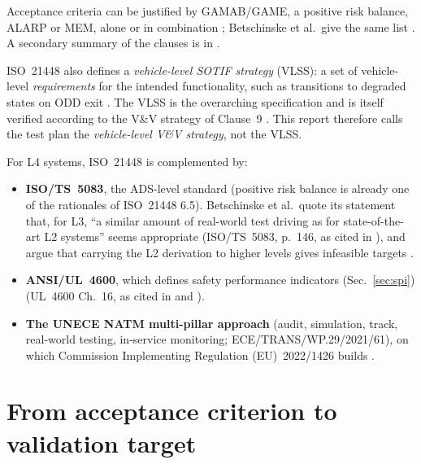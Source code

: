 \documentclass[11pt,a4paper]{article}
\begin{document}
Acceptance criteria can be justified by GAMAB/GAME, a positive risk balance, ALARP or MEM, alone or in combination \cite[6.5, pp.~30--31]{iso21448}; Betschinske et al.\ give the same list \cite[Sec.~III-B, item~2]{betschinske2025}. A secondary summary of the clauses is in \cite[Sec.~2.1, pp.~6--10]{schaller2026}.

ISO~21448 also defines a \emph{vehicle-level SOTIF strategy} (VLSS): a set of vehicle-level \emph{requirements} for the intended functionality, such as transitions to degraded states on ODD exit \cite[3.34, p.~10; D.1, p.~159]{iso21448}. The VLSS is the overarching specification and is itself verified according to the V\&V strategy of Clause~9 \cite[D.1, p.~159]{iso21448}. This report therefore calls the test plan the \emph{vehicle-level V\&V strategy}, not the VLSS.

For L4 systems, ISO~21448 is complemented by:
\begin{itemize}
\item \textbf{ISO/TS~5083}, the ADS-level standard (positive risk balance is already one of the rationales of ISO~21448 6.5). Betschinske et al.\ quote its statement that, for L3, ``a similar amount of real-world test driving as for state-of-the-art L2 systems'' seems appropriate (ISO/TS~5083, p.~146, as cited in \cite[Sec.~I]{betschinske2025}), and argue that carrying the L2 derivation to higher levels gives infeasible targets \cite[Sec.~I]{betschinske2025}.
\item \textbf{ANSI/UL~4600}, which defines safety performance indicators (Sec.~\ref{sec:spi}) (UL~4600 Ch.~16, as cited in \cite[Sec.~2]{ratiu2024} and \cite[slide~12]{koopman2022}).
\item \textbf{The UNECE NATM multi-pillar approach} (audit, simulation, track, real-world testing, in-service monitoring; ECE/TRANS/WP.29/2021/61), on which Commission Implementing Regulation (EU)~2022/1426 builds \cite[web article, no sections]{siemensnatm}.
\end{itemize}

\section{From acceptance criterion to validation target}\label{sec:vt}
\end{document}
